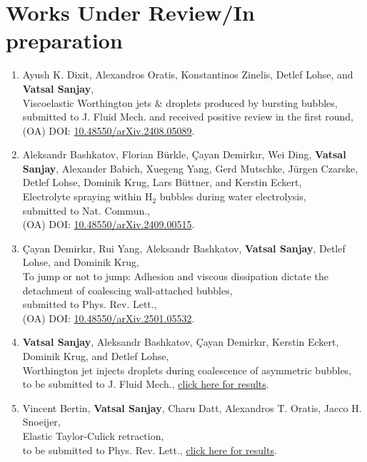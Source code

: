 \documentclass[10pt,a4paper,colorlinks,linkcolor=blue,urlcolor=blue,citecolor=blue]{moderncv}
\begin{document}
\section{\textbf{Works Under Review/In preparation}}

\begin{enumerate}[leftmargin=0.75cm]
	\item Ayush K. Dixit, Alexandros Oratis, Konstantinos Zinelis, Detlef Lohse, and \textbf{Vatsal Sanjay},\\
	Viscoelastic Worthington jets \& droplets produced by bursting bubbles,\\
	submitted to J. Fluid Mech. and received positive review in the first round,\\
	(OA) DOI: \href{https://doi.org/10.48550/arXiv.2408.05089}{{10.48550/arXiv.2408.05089}}.

	\item Aleksandr Bashkatov, Florian Bürkle, Çayan Demirkır, Wei Ding, \textbf{Vatsal Sanjay}, Alexander Babich, Xuegeng Yang, Gerd Mutschke, Jürgen Czarske, Detlef Lohse, Dominik Krug, Lars Büttner, and Kerstin Eckert,\\
	Electrolyte spraying within H$_2$ bubbles during water electrolysis,\\
	submitted to Nat. Commun.,\\
	(OA) DOI: \href{https://doi.org/10.48550/arXiv.2409.00515}{{10.48550/arXiv.2409.00515}}.

	\item Çayan Demirkır, Rui Yang, Aleksandr Bashkatov, \textbf{Vatsal Sanjay}, Detlef Lohse, and Dominik Krug,\\
	To jump or not to jump: Adhesion and viscous dissipation dictate the detachment of coalescing wall-attached bubbles,\\
	submitted to Phys. Rev. Lett.,\\
	(OA) DOI: \href{https://doi.org/10.48550/arXiv.2501.05532}{{10.48550/arXiv.2501.05532}}.

	\item \textbf{Vatsal Sanjay}, Aleksandr Bashkatov, Çayan Demirkır, Kerstin Eckert, Dominik Krug, and Detlef Lohse,\\
	Worthington jet injects droplets during coalescence of asymmetric bubbles,\\
	to be submitted to J. Fluid Mech., \href{https://youtu.be/WZonMHzzkXQ}{{click here for results}}.

	\item Vincent Bertin, \textbf{Vatsal Sanjay}, Charu Datt, Alexandros T. Oratis, Jacco H. Snoeijer,\\
	Elastic Taylor-Culick retraction,\\
	to be submitted to Phys. Rev. Lett., \href{https://tinyurl.com/2cvo89bd}{{click here for results}}.


\end{enumerate}
\end{document}
